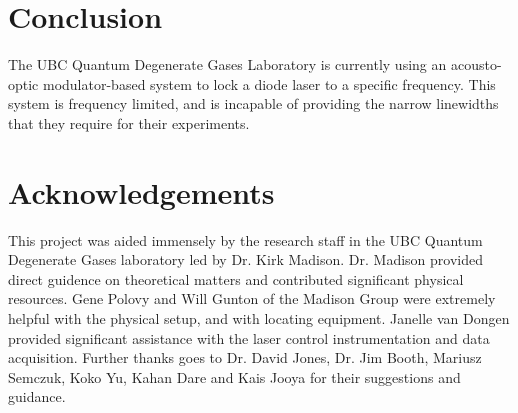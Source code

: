 \newpage
\section{Conclusion}

The UBC Quantum Degenerate Gases Laboratory is currently using an acousto-optic modulator-based system to lock a diode laser to a specific frequency.  This system is frequency limited, and is incapable of providing the narrow linewidths that they require for their experiments. \\

\section*{Acknowledgements}

This project was aided immensely by the research staff in the UBC Quantum Degenerate Gases laboratory led by Dr. Kirk Madison. Dr. Madison provided direct guidence on theoretical matters and contributed significant physical resources. Gene Polovy and Will Gunton of the Madison Group were extremely helpful with the physical setup, and with locating equipment. Janelle van Dongen provided significant assistance with the laser control instrumentation and data acquisition. Further thanks goes to Dr. David Jones, Dr. Jim Booth, Mariusz Semczuk, Koko Yu, Kahan Dare and Kais Jooya for their suggestions and guidance.